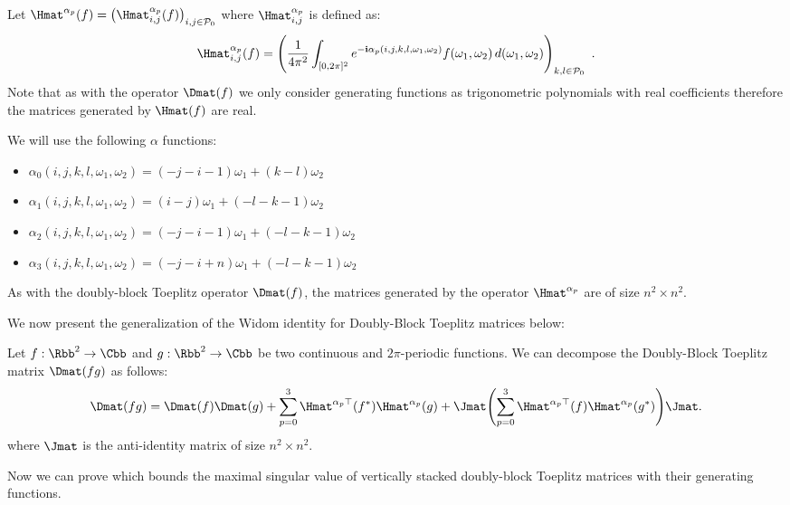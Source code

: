 Let $\Hmat^{\alpha_p} (f) = \leftmat \Hmat^{\alpha_p}_{i,j}(f) \rightmat_{i,j \in \mathcal{P}_0}$ where $\Hmat^{\alpha_p}_{i,j}$ is defined as:
\begin{equation}
  \Hmat^{\alpha_p}_{i,j}(f) =\leftmat \frac{1}{4\pi^{2}}\int_{[0,2\pi]^{2}} e^{-\ci \alpha_p(i, j, k, l, \omega_1, \omega_2)}  f(\omega_{1},\omega_{2})\,d(\omega_{1},\omega_{2})
  \rightmat_{k,l \in \mathcal{P}_0} \enspace.
\end{equation}
Note that as with the operator $\Dmat(f)$ we only consider generating functions as trigonometric polynomials with real coefficients therefore the matrices generated by $\Hmat(f)$ are real. 

We will use the following $\alpha$ functions:
\begin{itemize}
    \item[] $\alpha_0(i, j, k, l, \omega_1, \omega_2) = (-j-i-1)\omega_1 + (k-l)\omega_2$
    \item[] $\alpha_1(i, j, k, l, \omega_1, \omega_2) = (i-j)\omega_1 + (-l-k-1)\omega_2$
    \item[] $\alpha_2(i, j, k, l, \omega_1, \omega_2) = (-j-i-1)\omega_1 + (-l-k-1)\omega_2$
    \item[] $\alpha_3(i, j, k, l, \omega_1, \omega_2) = (-j-i+n)\omega_1 + (-l-k-1)\omega_2$
\end{itemize}
As with the doubly-block Toeplitz operator $\Dmat(f)$, the matrices generated by the operator $\Hmat^{\alpha_p}$ are of size $n^2 \times n^2$. 

We now present the generalization of the Widom identity for Doubly-Block Toeplitz matrices below:
\begin{lemma}
  Let $f:\Rbb^2 \rightarrow \Cbb$ and $g:\Rbb^2 \rightarrow \Cbb$ be two continuous and $2\pi$-periodic functions. 
We can decompose the Doubly-Block Toeplitz matrix $\Dmat(fg)$ as follows:
\begin{equation}
    \Dmat(fg) = \Dmat(f)\Dmat(g) + \sum_{p=0}^3 \Hmat^{\alpha_p \top}(f^*) \Hmat^{\alpha_p}(g) + \Jmat \left( \sum_{p=0}^3 \Hmat^{\alpha_p \top}(f) \Hmat^{\alpha_p }(g^*) \right) \Jmat.
\end{equation}
where $\Jmat$ is the anti-identity matrix of size $n^2 \times n^2$.
 \label{lemma:ch5-widom_idenity}
\end{lemma}


Now we can prove  which bounds the maximal singular value of vertically stacked doubly-block Toeplitz matrices with their generating functions. 

